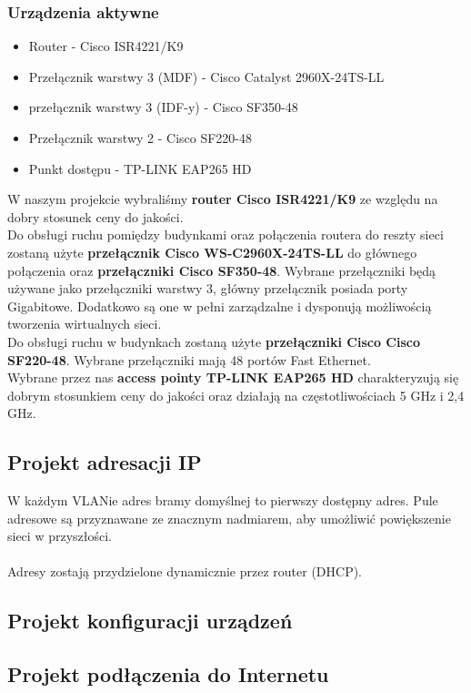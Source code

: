 \documentclass[a4paper,12pt]{extarticle}  %
\begin{document}
\subsubsection{Urządzenia aktywne}
\begin{itemize}
	\item Router - Cisco ISR4221/K9
	\item Przełącznik warstwy 3 (MDF) - Cisco Catalyst 2960X-24TS-LL
	\item przełącznik warstwy 3 (IDF-y) - Cisco SF350-48
	\item Przełącznik warstwy 2 - Cisco SF220-48
	\item Punkt dostępu - TP-LINK EAP265 HD
\end{itemize}
W naszym projekcie wybraliśmy \textbf{router Cisco ISR4221/K9} ze względu na dobry stosunek
ceny do jakości. \\

Do obsługi ruchu pomiędzy budynkami oraz połączenia routera do reszty sieci zostaną użyte
\textbf{przełącznik Cisco WS-C2960X-24TS-LL} do głównego połączenia oraz \textbf{przełączniki Cisco SF350-48}.
Wybrane przełączniki będą używane jako przełączniki warstwy 3, główny przełącznik posiada porty Gigabitowe.
Dodatkowo są one w pełni zarządzalne i dysponują możliwością tworzenia wirtualnych sieci.\\

Do obsługi ruchu w budynkach zostaną użyte \textbf{przełączniki Cisco Cisco SF220-48}.
Wybrane przełączniki mają 48 portów Fast Ethernet.\\

Wybrane przez nas \textbf{access pointy TP-LINK EAP265 HD} charakteryzują się dobrym stosunkiem ceny
do jakości oraz działają na częstotliwościach 5 GHz i 2,4 GHz.

\subsection{Projekt adresacji IP}
W każdym VLANie adres bramy domyślnej to pierwszy dostępny adres. Pule adresowe są przyznawane ze znacznym nadmiarem, aby umożliwić powiększenie sieci w przyszłości.\\\\
Adresy zostają przydzielone dynamicznie przez router (DHCP).
\subsection{Projekt konfiguracji urządzeń}
\subsection{Projekt podłączenia do Internetu}
\end{document}
